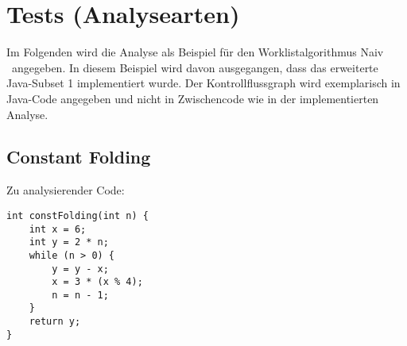 \section{Tests (Analysearten)}

Im Folgenden wird die Analyse als Beispiel für den Worklistalgorithmus \glqq Naiv \grqq\ angegeben.
In diesem Beispiel wird davon ausgegangen, dass das erweiterte Java-Subset 1 implementiert wurde.
Der Kontrollflussgraph wird exemplarisch in Java-Code angegeben und nicht in Zwischencode wie in der implementierten Analyse.


\subsection{Constant Folding}

Zu analysierender Code: \par

\begin{lstlisting}[frame=single]
int constFolding(int n) {
	int x = 6;
	int y = 2 * n;
	while (n > 0) {
		y = y - x;
		x = 3 * (x % 4);
		n = n - 1;
	}
	return y;
}
\end{lstlisting}

\par

